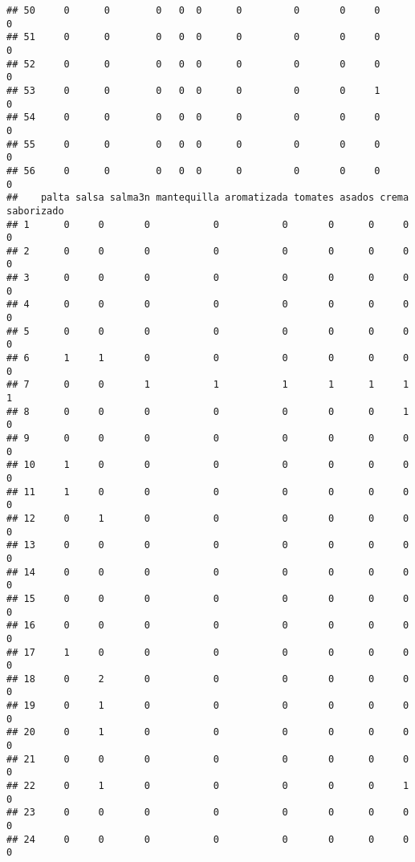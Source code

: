 \documentclass[
]{article}
\begin{document}
\begin{verbatim}
## 50     0      0        0   0  0      0         0       0     0            0
## 51     0      0        0   0  0      0         0       0     0            0
## 52     0      0        0   0  0      0         0       0     0            0
## 53     0      0        0   0  0      0         0       0     1            0
## 54     0      0        0   0  0      0         0       0     0            0
## 55     0      0        0   0  0      0         0       0     0            0
## 56     0      0        0   0  0      0         0       0     0            0
##    palta salsa salma3n mantequilla aromatizada tomates asados crema saborizado
## 1      0     0       0           0           0       0      0     0          0
## 2      0     0       0           0           0       0      0     0          0
## 3      0     0       0           0           0       0      0     0          0
## 4      0     0       0           0           0       0      0     0          0
## 5      0     0       0           0           0       0      0     0          0
## 6      1     1       0           0           0       0      0     0          0
## 7      0     0       1           1           1       1      1     1          1
## 8      0     0       0           0           0       0      0     1          0
## 9      0     0       0           0           0       0      0     0          0
## 10     1     0       0           0           0       0      0     0          0
## 11     1     0       0           0           0       0      0     0          0
## 12     0     1       0           0           0       0      0     0          0
## 13     0     0       0           0           0       0      0     0          0
## 14     0     0       0           0           0       0      0     0          0
## 15     0     0       0           0           0       0      0     0          0
## 16     0     0       0           0           0       0      0     0          0
## 17     1     0       0           0           0       0      0     0          0
## 18     0     2       0           0           0       0      0     0          0
## 19     0     1       0           0           0       0      0     0          0
## 20     0     1       0           0           0       0      0     0          0
## 21     0     0       0           0           0       0      0     0          0
## 22     0     1       0           0           0       0      0     1          0
## 23     0     0       0           0           0       0      0     0          0
## 24     0     0       0           0           0       0      0     0          0

\end{verbatim}
\end{document}
